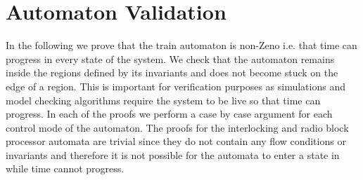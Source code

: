 \section{Automaton Validation}
In the following we prove that the train automaton is non-Zeno i.e. that time can progress in every state of the system. We check that the automaton remains inside the regions defined by its invariants and does not become stuck on the edge of a region. This is important for verification purposes as simulations and model checking algorithms require the system to be live so that time can progress. In each of the proofs we perform a case by case argument for each control mode of the automaton. The proofs for the interlocking and radio block processor  automata are trivial since they do not contain any flow conditions or invariants and therefore it is not possible for the automata to enter a state in while time cannot progress.
\medskip

